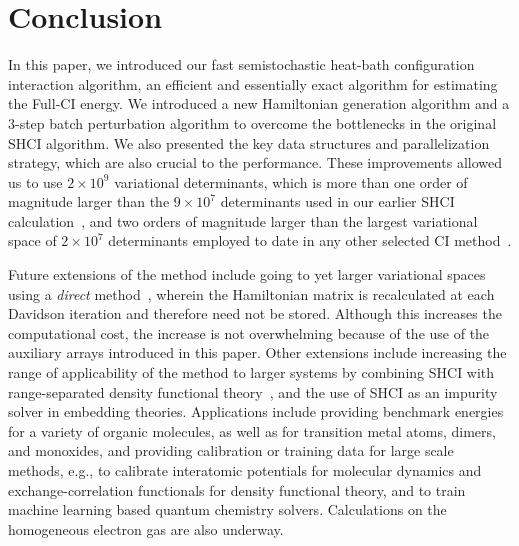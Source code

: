 \documentclass[%
preprint,
 superscriptaddress,
 amsmath,amssymb,
 aps,
]{revtex4-1}
\begin{document}
\section{Conclusion}
\label{conclusion}
In this paper, we introduced our fast semistochastic heat-bath configuration interaction algorithm, an efficient and essentially exact algorithm for estimating the Full-CI energy.
We introduced a new Hamiltonian generation algorithm and a 3-step batch perturbation algorithm to overcome the bottlenecks in the original SHCI algorithm.
We also presented the key data structures and parallelization strategy, which are also crucial to the performance.
These improvements allowed us to use $2 \times 10^9$ variational determinants, which is more than one order of magnitude larger than the $9\times 10^7$ determinants
used in our earlier SHCI calculation~\cite{ChiHolOttUmrShaZim-JPCA-18}, and two orders of magnitude larger than the largest variational space of $2\times 10^7$ determinants
employed to date in any other selected CI method~\cite{GarSceLooCaf-JCP-17}.

Future extensions of the method include going to yet larger variational spaces using a \emph{direct} method~\cite{Knowles1984,IvaRue-TCA-01}, wherein the Hamiltonian matrix is recalculated at each Davidson iteration and therefore need not be stored.
Although this increases the computational cost, the increase is not overwhelming because of the use of the auxiliary arrays introduced in this paper.
Other extensions include increasing the range of applicability of the method to larger systems by combining SHCI with range-separated density functional theory~\cite{Sav-INC-96},
and the use of SHCI as an impurity solver in embedding theories.
Applications include providing benchmark energies for a variety of organic molecules, as well as for transition metal atoms, dimers, and monoxides,
and providing calibration or training data for large scale methods,
e.g., to calibrate interatomic potentials for molecular dynamics and exchange-correlation functionals for density functional theory,
and to train machine learning based quantum chemistry solvers.
Calculations on the homogeneous electron gas are also underway.\\[1mm]
\end{document}
